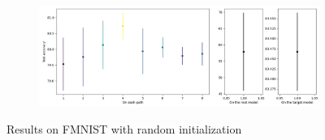 \documentclass{article}
\begin{document}
\begin{figure}[htbp]
    \vspace{0.5cm}
    
    \begin{subfigure}[b]{0.5\textwidth}
        \centering
        \includegraphics[width=\textwidth]{imgs/statistical_reliability_FNIST_random_2024_05_02_15_13_27.png}
    \end{subfigure}
    \caption{Results on FMNIST with random initialization}
\end{figure}
\end{document}
